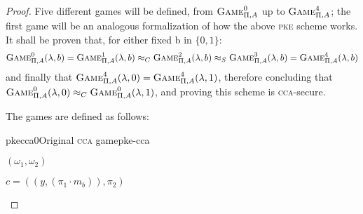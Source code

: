 \begin{proof}
    Five different games will be defined, from $\textsc{Game}_{\Pi, A}^0$ up to $\textsc{Game}_{\Pi, A}^4$; the first game will be an analogous formalization of how the above \textsc{pke} scheme works. It shall be proven that, for either fixed b in $\{0, 1\}$:
    \begin{equation*}
        \textsc{Game}_{\Pi, A}^0(\lambda, b) = \textsc{Game}_{\Pi, A}^1(\lambda, b) \approx_C \textsc{Game}_{\Pi, A}^2(\lambda, b) \approx_S \textsc{Game}_{\Pi, A}^3(\lambda, b) = \textsc{Game}_{\Pi, A}^4(\lambda, b)
    \end{equation*}
    and finally that $\textsc{Game}_{\Pi, A}^4(\lambda, 0) = \textsc{Game}_{\Pi, A}^4(\lambda, 1)$, therefore concluding that $\textsc{Game}_{\Pi, A}^0(\lambda, 0) \approx_C \textsc{Game}_{\Pi, A}^0(\lambda, 1)$, and proving this scheme is \textsc{cca}-secure.


    The games are defined as follows:

    \begin{cryptogame}{pkecca0}{Original \textsc{cca} game}{pke-cca}
    
        {$(\omega_1, \omega_2)$}
        {}
    
        \send{}{}{}
        \receive{}{}{}
    
        \postlevel
    
        {$c = ((y, (\pi_1 \cdot m_b)), \pi_2)$}
        {}
    
        \postlevel
    
        \send{}{}{}
        \receive{}{}{}
    

\end{cryptogame}
\end{proof}
